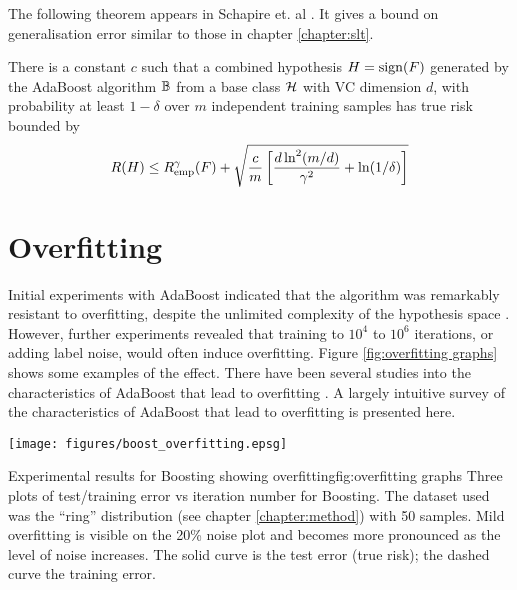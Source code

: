 The following theorem appears in Schapire et. al \cite{Schapire97}.
It gives a bound on generalisation error similar to those in chapter
\ref{chapter:slt}.

\begin{theorem}[Performance bound for boosting ($p$=1)]

There is a constant $c$ such that a combined hypothesis $H = \mathrm{sign}(F)$
generated by the AdaBoost algorithm $\mathbb{B}$ from a base class $\mathcal{H}$
with VC dimension $d$, with probability at least $1 - \delta$ over $m$
independent training samples has true risk bounded by 
\begin{equation}
R(H) \leq R_{\mathrm{emp}}^{\gamma}(F) + \sqrt{\frac{c}{m} \left[ \frac{d
\ln^2 (m/d)}{\gamma^2} + \ln(1/\delta) \right] }
\end{equation}
\end{theorem}


\section{Overfitting}
\label{sec:boost overfitting}

Initial experiments with AdaBoost indicated that the algorithm was
remarkably resistant to overfitting, despite the unlimited complexity
of the hypothesis space \cite{Freund96}.
However, further experiments \cite{Grove98, Bauer99} revealed that
training to $10^4$ to $10^6$ iterations, or adding label noise, would
often induce overfitting.  Figure \ref{fig:overfitting graphs} shows some
examples of the effect.  There have been several studies into the
characteristics of AdaBoost that lead to overfitting \cite{Schapire97,
Grove98, Ratsch98}.  A largely intuitive survey of the characteristics
of AdaBoost that lead to overfitting is presented here. 

\begin{linefigure}
\begin{center}
\texttt{[image: figures/boost\_overfitting.epsg]}
\end{center}
\begin{capt}{Experimental results for Boosting showing
overfitting}{fig:overfitting graphs}
Three plots of test/training error vs iteration number for Boosting.
The dataset used was the ``ring'' distribution (see chapter
\ref{chapter:method}) with 50 samples.  Mild overfitting is visible on
the 20\% noise plot and becomes more pronounced as the level of noise
increases.  The solid curve is the test error (true risk); the dashed
curve the training error.
\end{capt}
\end{linefigure}


